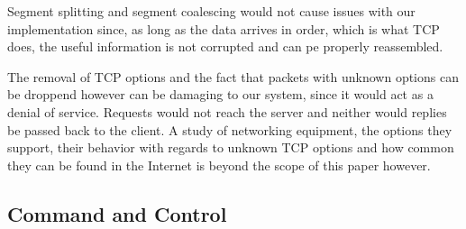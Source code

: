 Segment splitting and segment coalescing would not cause issues with our implementation
since, as long as the data arrives in order, which is what TCP does, the useful
information is not corrupted and can pe properly reassembled.

The removal of TCP options and the fact that packets with unknown options can be
droppend however can be damaging to our system, since it would act as a denial of
service. Requests would not reach the server and neither would replies be passed
back to the client. A study of networking equipment, the options they support, their
behavior with regards to unknown TCP options and how common they can be found in
the Internet is beyond the scope of this paper however.

\subsection{Command and Control}
